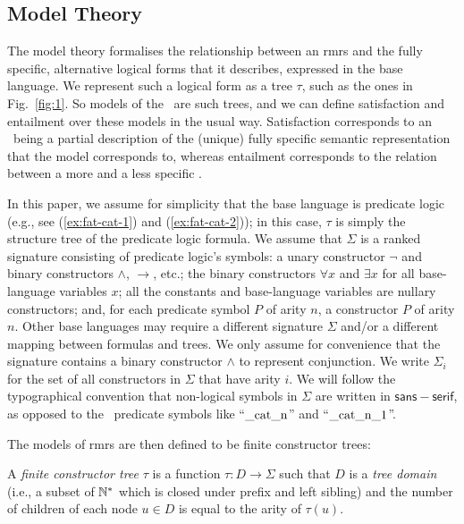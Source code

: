 \subsection{Model Theory}

The model theory formalises the relationship between an {\sc rmrs} and
the fully specific, alternative logical forms that it describes,
expressed in the base language.  We represent such a logical form as a
tree $\tau$, such as the ones in Fig.~\ref{fig:1}.  So models of the
\rmrs\ are such trees, and we can define satisfaction and entailment
over these models in the usual way.  Satisfaction corresponds to an
\rmrs\ being a partial description of the (unique) fully specific
semantic representation that the model corresponds to, whereas
entailment corresponds to the relation between a more and a less
specific \rmrs.

In this paper, we assume for simplicity that the base language is
predicate logic (e.g., see (\ref{ex:fat-cat-1}) and
(\ref{ex:fat-cat-2})); in this case, $\tau$ is simply the structure
tree of 
the predicate logic formula.  We assume that $\Sigma$ is a ranked
signature consisting of predicate logic's symbols: a unary constructor
$\neg$ and binary constructors $\wedge$, $\rightarrow$, etc.; the
binary constructors $\forall x$ and $\exists x$ for all base-language
variables $x$; all the constants and base-language variables are
nullary constructors; and, for each predicate symbol $P$ of arity $n$,
a constructor $P$ of arity $n$.  Other base languages may require a
different signature $\Sigma$ and/or a different mapping between
formulas and trees.  We only assume for convenience that the signature
contains a binary constructor $\wedge$ to represent conjunction.  We
write $\Sigma_i$ for the set of all constructors in $\Sigma$ that have
arity $i$.  We will follow the typographical convention that
non-logical symbols in $\Sigma$ are written in
$\mathsf{sans{-}serif}$, as opposed to the \rmrs\ predicate symbols
like ``$\mathrm{\_cat\_n}$'' and ``$\mathrm{\_cat\_n\_1}$''.

The models of {\sc rmrs} are then defined to be finite constructor
trees:
\begin{definition}\label{defn:models}
  A {\em finite constructor tree} $\tau$ is a function $\tau:D
  \rightarrow \Sigma$ such that $D$ is a \emph{tree domain} (i.e., a
  subset of $\mathbb{N}^*$ which is closed under prefix and left sibling) and
  the number of children of each node $u \in D$ is equal to the arity
  of $\tau(u)$.  
\end{definition}


